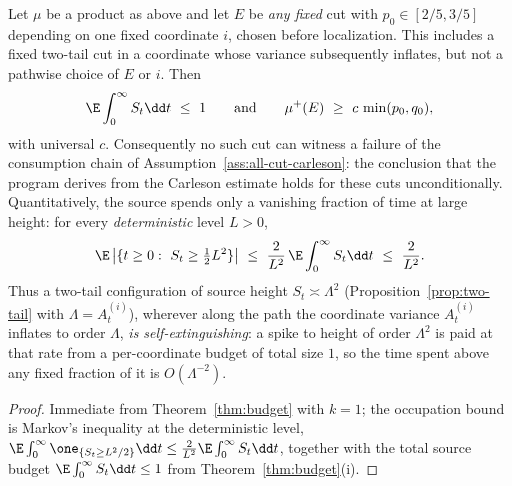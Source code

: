 \documentclass[../../main.tex]{subfiles}
\begin{document}
\begin{corollary}
\label{cor:refutation}
Let $\mu$ be a product as above and let $E$ be \emph{any fixed} cut with
$p_0\in[2/5,3/5]$ depending on one
fixed coordinate $i$, chosen before localization. This includes a fixed two-tail cut in a
coordinate whose variance subsequently inflates, but not a pathwise choice of $E$ or $i$. Then
\[
  \E\int_0^\infty S_t\dd t\ \le\ 1
  \qquad\text{and}\qquad
  \mu^+(E)\ \ge\ c\,\min(p_0,q_0),
\]
with universal $c$. Consequently no such cut can witness a failure of the consumption chain of
Assumption~\ref{ass:all-cut-carleson}: the conclusion that the program derives from the Carleson estimate holds for
these cuts unconditionally. Quantitatively, the source spends only a vanishing fraction of time
at large height: for every \emph{deterministic} level $L>0$,
\[
  \E\,\bigl|\{t\ge0:\ S_t\ge\tfrac12L^2\}\bigr|
  \ \le\ \frac2{L^2}\,\E\int_0^\infty S_t\dd t\ \le\ \frac2{L^2}.
\]
Thus a two-tail configuration of source height $S_t\asymp\Lambda^2$
(Proposition~\ref{prop:two-tail} with $\Lambda=A_t^{(i)}$), wherever along the path the
coordinate variance $A_t^{(i)}$ inflates to order $\Lambda$, \emph{is self-extinguishing}: a
spike to height of order $\Lambda^2$ is paid at that rate from a per-coordinate budget of total
size $1$, so the time spent above any fixed fraction of it is $O(\Lambda^{-2})$.
\end{corollary}

\begin{proof}
Immediate from Theorem~\ref{thm:budget} with $k=1$; the occupation bound is Markov's inequality
at the deterministic level,
$\E\int_0^\infty\one_{\{S_t\ge L^2/2\}}\dd t\le\frac2{L^2}\E\int_0^\infty S_t\dd t$, together with
the total source budget $\E\int_0^\infty S_t\dd t\le1$ from Theorem~\ref{thm:budget}(i).
\end{proof}
\end{document}
